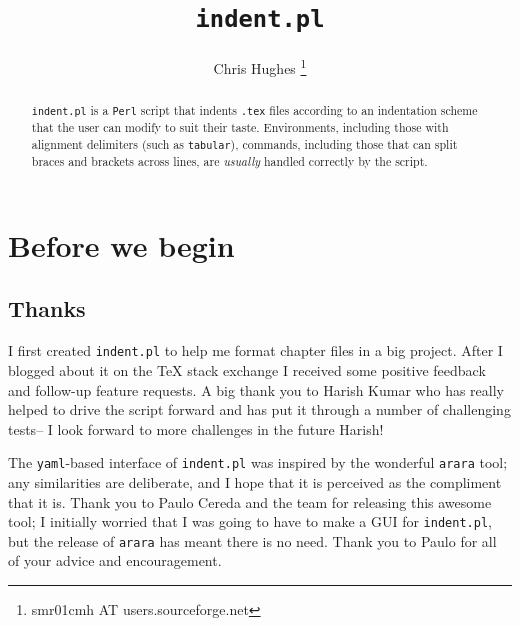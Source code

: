 


\title{\lstinline[basicstyle=\huge\ttfamily]!indent.pl!}
\author{Chris Hughes \footnote{smr01cmh AT users.sourceforge.net}}
\maketitle
\begin{abstract}
	\lstinline!indent.pl! is a \lstinline!Perl! script that indents \lstinline!.tex!
	files according to an indentation scheme that the user can modify to suit their 
	taste. Environments, including those with alignment delimiters (such as \lstinline!tabular!), 
	commands, including those that can split braces and brackets across lines, 
	are \emph{usually} handled correctly by the script.
\end{abstract}

\tableofcontents
\lstlistoflistings

\section{Before we begin}
\subsection{Thanks}
I first created \lstinline!indent.pl! to help me format chapter files 
in a big project. After I blogged about it on the 
\TeX{} stack exchange \cite{cmhblog} I received some positive feedback and 
follow-up feature requests. A big thank you to Harish Kumar who has really 
helped to drive the script forward and has put it through a number of challenging
tests-- I look forward to more challenges in the future Harish!
 	 	 	 	 	
The \lstinline!yaml!-based interface of \lstinline!indent.pl! was inspired 
by the wonderful \lstinline!arara! tool; any similarities are deliberate, and 
I hope that it is perceived as the compliment that it is. Thank you to Paulo Cereda and the 
team for releasing this awesome tool; I initially worried that I was going to 
have to make a GUI for \lstinline!indent.pl!, but the release of \lstinline!arara! 
has meant there is no need. Thank you to Paulo for all of your advice and 
encouragement.
 	 	 	 	 	
